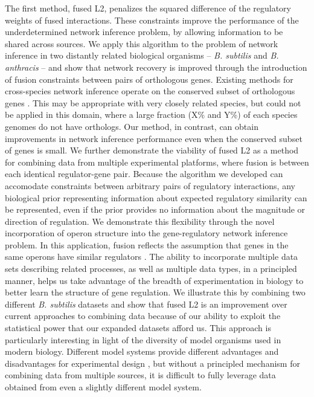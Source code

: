 \documentclass[11pt]{article}
\begin{document}
 The first method, fused L2, penalizes the squared difference of the regulatory weights of fused interactions. These constraints improve the performance of the underdetermined network inference problem, by allowing information to be shared across sources. We apply this algorithm to the problem of network inference in two distantly related biological organisms -- \textit{B. subtilis} and \textit{B. anthracis} -- and show that network recovery is improved through the introduction of fusion constraints between pairs of orthologous genes. Existing methods for cross-species network inference operate on the conserved subset of orthologous genes \cite{dillman_comparative_2015}. This may be appropriate with very closely related species, but could not be applied in this domain, where a large fraction (X\% and Y\%) of each species genomes do not have orthologs. Our method, in contrast, can obtain improvements in network inference performance even when the conserved subset of genes is small. We further demonstrate the viability of fused L2 as a method for combining data from multiple experimental platforms, where fusion is between each identical regulator-gene pair. Because the algorithm we developed can accomodate constraints between arbitrary pairs of regulatory interactions, any biological prior representing information about expected regulatory similarity can be represented, even if the prior provides no information about the magnitude or direction of regulation. We demonstrate this flexibility through the novel incorporation of operon structure into the gene-regulatory network inference problem. In this application, fusion reflects the assumption that genes in the same operons have similar regulators \cite{lawrence_shared_2002}. The ability to incorporate multiple data sets describing related processes, as well as multiple data types, in a principled manner, helps us take advantage of the breadth of experimentation in biology to better learn the structure of gene regulation. We illustrate this by combining two different \textit{B. subtilis} datasets and show that fused L2 is an improvement over current approaches to combining data \cite{marbach_revealing_2010} because of our ability to exploit the statistical power that our expanded datasets afford us. This approach is particularly interesting in light of the diversity of model organisms used in modern biology. Different model systems provide different advantages and disadvantages for experimental design \cite{stolfi_genetic_2012}, but without a principled mechanism for combining data from multiple sources, it is difficult to fully leverage data obtained from even a slightly different model system. 
\end{document}

